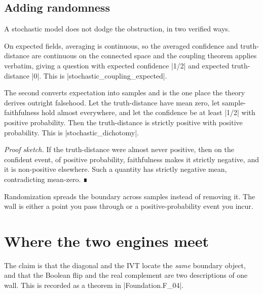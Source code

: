 \documentclass{memoir}
\begin{document}
\subsection{Adding randomness}\label{Two--Schemas--of--Impossibility-005F-005F-005F--Machine--Checked--Limits--of--Trustworthy--Machine--Learning-005F-005F-005F--and--Why--They--Tighten--with--Capability----From--Logic--to--Analysis----The--discrete--core----Adding--randomness}

A stochastic model does not dodge the obstruction, in two verified ways.

On expected fields, averaging is continuous, so the averaged confidence and
truth-distance are continuous on the connected space and the coupling theorem
applies verbatim, giving a question with expected confidence \LeanVerb|1/2| and expected
truth-distance \LeanVerb|0|. This is \LeanVerb|stochastic_coupling_expected|.

The second converts expectation into samples and is the one place the theory
derives outright falsehood. Let the truth-distance have mean zero, let
sample-faithfulness hold almost everywhere, and let the confidence be at least
\LeanVerb|1/2| with positive probability. Then the truth-distance is strictly positive
with positive probability. This is \LeanVerb|stochastic_dichotomy|.

\emph{Proof sketch.} If the truth-distance were almost never positive, then on the confident
event, of positive probability, faithfulness makes it strictly negative, and it
is non-positive elsewhere. Such a quantity has strictly negative mean,
contradicting mean-zero. ∎

Randomization spreads the boundary across samples instead of removing it. The
wall is either a point you pass through or a positive-probability event you
incur.



\section{Where the two engines meet}\label{Two--Schemas--of--Impossibility-005F-005F-005F--Machine--Checked--Limits--of--Trustworthy--Machine--Learning-005F-005F-005F--and--Why--They--Tighten--with--Capability----From--Logic--to--Analysis----Where--the--two--engines--meet}

The claim is that the diagonal and the IVT locate the \emph{same} boundary object,
and that the Boolean flip and the real complement are two descriptions of one
wall. This is recorded as a theorem in \LeanVerb|Foundation.F_04|.
\end{document}
